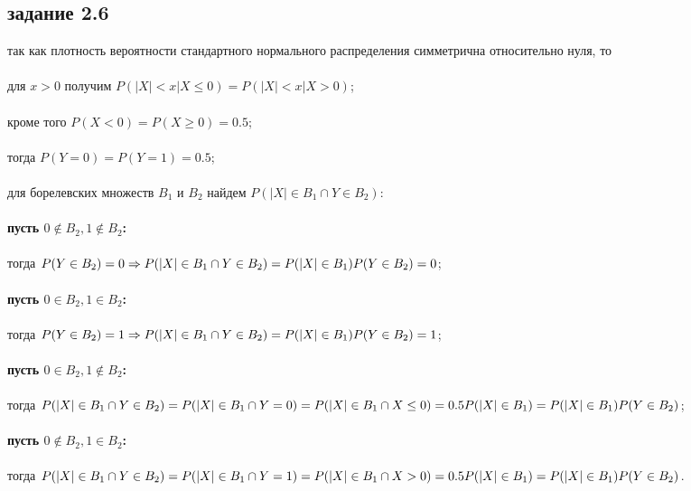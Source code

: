 \documentclass[a4paper]{article}
\begin{document}
\begin{large}
	\section*{задание 2.6}
	так как плотность вероятности стандартного нормального распределения симметрична относительно нуля, то\\\\
	для $x>0$ получим $P(|X|<x|X\le0)=P(|X|<x|X>0)$;\\\\
	кроме того $P(X<0)=P(X\ge0)=0.5$;\\\\
	тогда $P(Y=0)=P(Y=1)=0.5$;\\\\
	для борелевских множеств $B_1$ и $B_2$ найдем $P(|X|\in B_1\cap Y\in B_2)$:\\\\
	\textbf{пусть $0\notin B_2, 1\notin B_2$:}\\\\
	тогда $P(Y\in B_2)=0\Rightarrow\\\\
	P(|X|\in B_1\cap Y\in B_2)=P(|X|\in B_1)P(Y\in B_2)=0$;\\\\
	\textbf{пусть $0\in B_2, 1\in B_2$:}\\\\
	тогда $P(Y\in B_2)=1\Rightarrow\\\\
	P(|X|\in B_1\cap Y\in B_2)=P(|X|\in B_1)P(Y\in B_2)=1$;\\\\
	\textbf{пусть $0\in B_2, 1\notin B_2$:}\\\\
	тогда $P(|X|\in B_1\cap Y\in B_2)=P(|X|\in B_1\cap Y=0)=\\\\
	P(|X|\in B_1\cap X\le 0)=0.5P(|X|\in B_1)=P(|X|\in B_1)P(Y\in B_2)$;\\\\
	\textbf{пусть $0\notin B_2, 1\in B_2$:}\\\\
	тогда $P(|X|\in B_1\cap Y\in B_2)=P(|X|\in B_1\cap Y=1)=\\\\
	P(|X|\in B_1\cap X>0)=0.5P(|X|\in B_1)=P(|X|\in B_1)P(Y\in B_2)$.
	\end{large}
\end{document}
